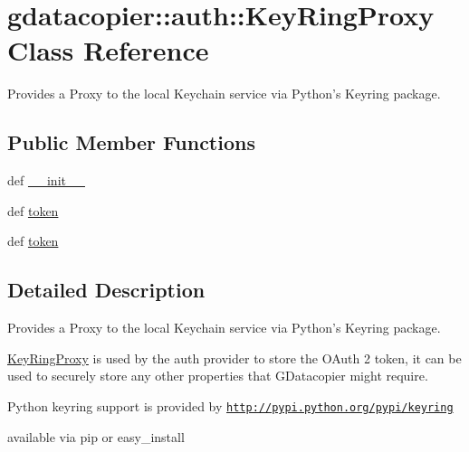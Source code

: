 \hypertarget{classgdatacopier_1_1auth_1_1_key_ring_proxy}{\section{gdatacopier\-:\-:auth\-:\-:\-Key\-Ring\-Proxy \-Class \-Reference}
\label{classgdatacopier_1_1auth_1_1_key_ring_proxy}
}


\-Provides a \-Proxy to the local \-Keychain service via \-Python's \-Keyring package.  


\subsection*{\-Public \-Member \-Functions}
\begin{DoxyCompactItemize}
\item 
def \hyperlink{classgdatacopier_1_1auth_1_1_key_ring_proxy_a075ca65a66b2332fb9d9b9842dcc24af}{\-\_\-\-\_\-init\-\_\-\-\_\-}
\item 
def \hyperlink{classgdatacopier_1_1auth_1_1_key_ring_proxy_a9b38c1c970df21779517e4a4b9684e7b}{token}
\item 
def \hyperlink{classgdatacopier_1_1auth_1_1_key_ring_proxy_a9b38c1c970df21779517e4a4b9684e7b}{token}
\end{DoxyCompactItemize}


\subsection{\-Detailed \-Description}
\-Provides a \-Proxy to the local \-Keychain service via \-Python's \-Keyring package. 

\hyperlink{classgdatacopier_1_1auth_1_1_key_ring_proxy}{\-Key\-Ring\-Proxy} is used by the auth provider to store the \-O\-Auth 2 token, it can be used to securely store any other properties that \-G\-Datacopier might require.

\-Python keyring support is provided by \href{http://pypi.python.org/pypi/keyring}{\tt http\-://pypi.\-python.\-org/pypi/keyring}

available via pip or easy\-\_\-install 

